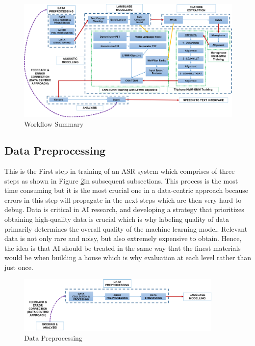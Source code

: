 \documentclass{article}
\begin{document}
\begin{figure}[h]
    \centering
    \includegraphics[width=1.0\textwidth]{img/workflow.png}
    \caption{Workflow Summary}
    \label{fig:workflow}
\end{figure}


\subsection{Data Pre\-processing}

This is the First step in training of an ASR system which comprises of three steps as shown in Figure \ref{fig:working_pipeline-1}in subsequent subsections. This process is the most time consuming but it is the most crucial one in a data-centric approach because errors in this step will propagate in the next steps which are then very hard to debug. Data is critical in AI research, and developing a strategy that prioritizes obtaining high-quality data is crucial which is why labeling quality of data primarily determines the overall quality of the machine learning model. Relevant data is not only rare and noisy, but also extremely expensive to obtain. Hence, the idea is that AI should be treated in the same way that the finest materials would be when building a house which is why evaluation at each level rather than just once. 

\begin{figure}[h]
    \centering
    \includegraphics[width=0.9\textwidth]{img/workflow-1.png}
    \caption{Data Pre\-processing}
    \label{fig:working_pipeline-1}
\end{figure}
\end{document}
